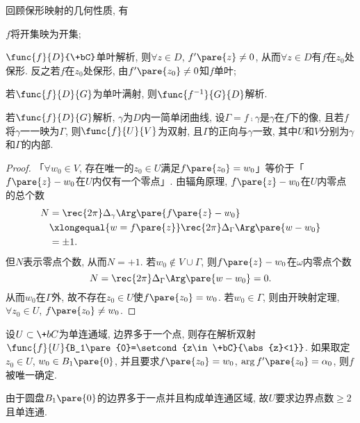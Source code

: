 \documentclass[../ComplexVariable.tex]{subfiles}
\begin{document}
\begin{remark}
    回顾保形映射的几何性质, 有
    \begin{cenum}
        \item $f$将开集映为开集;
        \item $\func{f}{D}{\+bC}$单叶解析, 则$\forall z\in D$, $f'\pare{z}\neq 0$, 从而$\forall z\in D$有$f$在$z_0$处保形. 反之若$f$在$z_0$处保形, 由$f'\pare{z_0}\neq 0$知$f$单叶;
        \item 若$\func{f}{D}{G}$为单叶满射, 则$\func{f^{-1}}{G}{D}$解析.
    \end{cenum}
\end{remark}
\begin{proposition}
    若$\func{f}{D}{G}$解析, $\gamma$为$D$内一简单闭曲线, 设$\Gamma = f\comp \gamma$是$\gamma$在$f$下的像, 且若$f$将$\gamma$一一映为$\Gamma$, 则$\func{f}{U}{V}$为双射, 且$\Gamma$的正向与$\gamma$一致, 其中$U$和$V$分别为$\gamma$和$\Gamma$的内部.
\end{proposition}
\begin{figure}[ht]
    \centering
\end{figure}
\begin{proof}
    「$\forall w_0 \in V$, 存在唯一的$z_0 \in U$满足$f\pare{z_0} = w_0$」等价于「$f\pare{z} - w_0$在$U$内仅有一个零点」. 由辐角原理, $f\pare{z} - w_0$在$U$内零点的总个数
    \begin{align*}
        N &= \rec{2\pi}\Delta_\gamma \Arg\pare{f\pare{z} - w_0} \\
        &\xlongequal{w=f\pare{z}} \rec{2\pi} \Delta_\Gamma \Arg\pare{w-w_0} \\
        &= \pm 1.
    \end{align*}
    但$N$表示零点个数, 从而$N = +1$. 若$w_0\notin V\cup \Gamma$, 则$f\pare{z}  - w_0$在$\omega$内零点个数
    \[ N = \rec{2\pi} \Delta_\Gamma \Arg\pare{w-w_0} = 0. \]
    从而$w_0$在$\Gamma$外, 故不存在$z_0\in U$使$f\pare{z_0}=w_0$. 若$w_0\in \Gamma$, 则由开映射定理, $\forall z_0\in U$, $f\pare{z_0}\neq w_0$.
\end{proof}
\begin{theorem}[Riemann映射定理]
    设$U\subset \+bC$为单连通域, 边界多于一个点, 则存在解析双射$\func{f}{U}{B_1\pare{0}=\setcond{z\in\+bC}{\abs{z}<1}}$. 如果取定$z_0 \in U$, $w_0 \in B_1\pare{0}$, 并且要求$f\pare{z_0} = w_0$, $\arg f'\pare{z_0} = \alpha_0$, 则$f$被唯一确定.
\end{theorem}
\begin{remark}
    由于圆盘$B_1\pare{0}$的边界多于一点并且构成单连通区域, 故$U$要求边界点数$\ge 2$且单连通.
\end{remark}
\end{document}
